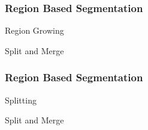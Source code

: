 \documentclass{beamer}
\begin{document}
\begin{frame}
\frametitle{Region Based Segmentation}
\begin{block}{Region Growing}
\end{block}

\begin{block}{Split and Merge}
\end{block}
\end{frame}

\begin{frame}
\frametitle{Region Based Segmentation}
\begin{block}{Splitting}
\end{block}

\begin{block}{Split and Merge}
\end{block}
\end{frame}
\end{document}
